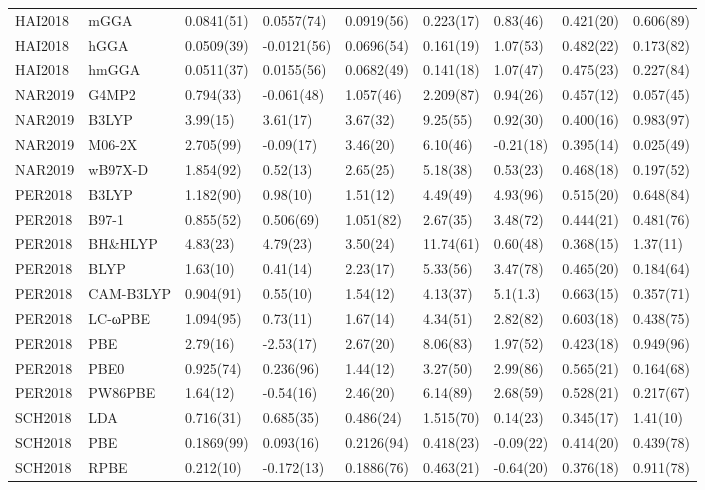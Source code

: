 \begin{table}[ht]
\begin{tabular}{lllllllll}
  HAI2018 & mGGA & 0.0841(51) & 0.0557(74) & 0.0919(56) & 0.223(17) & 0.83(46) & 0.421(20) & 0.606(89) \\ 
  HAI2018 & hGGA & 0.0509(39) & -0.0121(56) & 0.0696(54) & 0.161(19) & 1.07(53) & 0.482(22) & 0.173(82) \\ 
  HAI2018 & hmGGA & 0.0511(37) & 0.0155(56) & 0.0682(49) & 0.141(18) & 1.07(47) & 0.475(23) & 0.227(84) \\ 
  NAR2019 & G4MP2 & 0.794(33) & -0.061(48) & 1.057(46) & 2.209(87) & 0.94(26) & 0.457(12) & 0.057(45) \\ 
  NAR2019 & B3LYP & 3.99(15) & 3.61(17) & 3.67(32) & 9.25(55) & 0.92(30) & 0.400(16) & 0.983(97) \\ 
  NAR2019 & M06-2X & 2.705(99) & -0.09(17) & 3.46(20) & 6.10(46) & -0.21(18) & 0.395(14) & 0.025(49) \\ 
  NAR2019 & wB97X-D & 1.854(92) & 0.52(13) & 2.65(25) & 5.18(38) & 0.53(23) & 0.468(18) & 0.197(52) \\ 
  PER2018 & B3LYP & 1.182(90) & 0.98(10) & 1.51(12) & 4.49(49) & 4.93(96) & 0.515(20) & 0.648(84) \\ 
  PER2018 & B97-1 & 0.855(52) & 0.506(69) & 1.051(82) & 2.67(35) & 3.48(72) & 0.444(21) & 0.481(76) \\ 
  PER2018 & BH\&HLYP & 4.83(23) & 4.79(23) & 3.50(24) & 11.74(61) & 0.60(48) & 0.368(15) & 1.37(11) \\ 
  PER2018 & BLYP & 1.63(10) & 0.41(14) & 2.23(17) & 5.33(56) & 3.47(78) & 0.465(20) & 0.184(64) \\ 
  PER2018 & CAM-B3LYP & 0.904(91) & 0.55(10) & 1.54(12) & 4.13(37) & 5.1(1.3) & 0.663(15) & 0.357(71) \\ 
  PER2018 & LC-ωPBE & 1.094(95) & 0.73(11) & 1.67(14) & 4.34(51) & 2.82(82) & 0.603(18) & 0.438(75) \\ 
  PER2018 & PBE & 2.79(16) & -2.53(17) & 2.67(20) & 8.06(83) & 1.97(52) & 0.423(18) & 0.949(96) \\ 
  PER2018 & PBE0 & 0.925(74) & 0.236(96) & 1.44(12) & 3.27(50) & 2.99(86) & 0.565(21) & 0.164(68) \\ 
  PER2018 & PW86PBE & 1.64(12) & -0.54(16) & 2.46(20) & 6.14(89) & 2.68(59) & 0.528(21) & 0.217(67) \\ 
  SCH2018 & LDA & 0.716(31) & 0.685(35) & 0.486(24) & 1.515(70) & 0.14(23) & 0.345(17) & 1.41(10) \\ 
  SCH2018 & PBE & 0.1869(99) & 0.093(16) & 0.2126(94) & 0.418(23) & -0.09(22) & 0.414(20) & 0.439(78) \\ 
  SCH2018 & RPBE & 0.212(10) & -0.172(13) & 0.1886(76) & 0.463(21) & -0.64(20) & 0.376(18) & 0.911(78) \\ 

\end{tabular}
\end{table}
